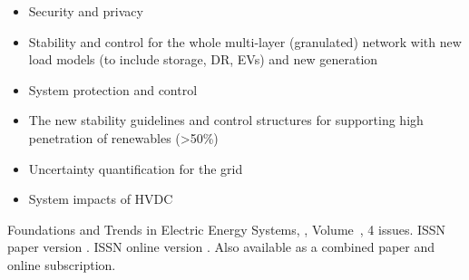 {\begin{multicols}{2}
\begin{itemize}
\item{Security and privacy}
\item{Stability and control for the whole multi-layer (granulated) network with new load models (to include storage, DR, EVs) and new generation}
\item{System protection and control}
\item{The new stability guidelines and control structures for supporting high penetration of renewables (>50\%)}
\item{Uncertainty quantification for the grid}
\item{System impacts of HVDC}
\end{itemize}
 \end{multicols}
 }


\journallibraryinfo
 {%
  Foundations and Trends\textsuperscript{\textregistered} in
 Electric Energy Systems, ,
  Volume~, 4 issues.
  ISSN paper version .
  ISSN online version .
  Also available as a combined paper and online
  subscription.
 } 